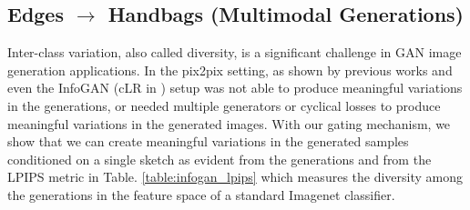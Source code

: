 


\subsection{Edges $\rightarrow$ Handbags (Multimodal Generations)}
Inter-class variation, also called diversity, is a significant challenge in GAN image generation applications. 
In the pix2pix setting, as shown by previous works \cite{ghosh2017multi} and \cite{zhu2017toward} even the InfoGAN (cLR in \cite{zhu2017toward}) setup was not able to produce meaningful variations in the generations, or needed multiple generators or cyclical losses to produce meaningful variations in the generated images. 
With our gating mechanism, we show that we can create meaningful variations in the generated samples conditioned on a single sketch as evident from the generations  and from the LPIPS metric \cite{zhang2018unreasonable} in  Table. \ref{table:infogan_lpips} which measures the diversity among the generations in the feature space of a standard Imagenet classifier.




